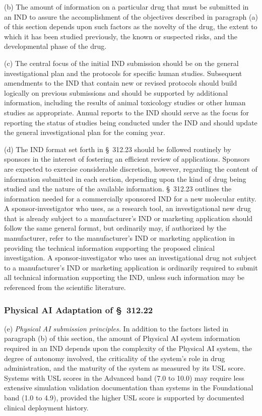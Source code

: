 \documentclass[11pt]{article}
\begin{document}
(b) The amount of information on a particular drug that must be submitted in an IND to assure the accomplishment of the objectives described in paragraph (a) of this section depends upon such factors as the novelty of the drug, the extent to which it has been studied previously, the known or suspected risks, and the developmental phase of the drug.

(c) The central focus of the initial IND submission should be on the general investigational plan and the protocols for specific human studies. Subsequent amendments to the IND that contain new or revised protocols should build logically on previous submissions and should be supported by additional information, including the results of animal toxicology studies or other human studies as appropriate. Annual reports to the IND should serve as the focus for reporting the status of studies being conducted under the IND and should update the general investigational plan for the coming year.

(d) The IND format set forth in \S~312.23 should be followed routinely by sponsors in the interest of fostering an efficient review of applications. Sponsors are expected to exercise considerable discretion, however, regarding the content of information submitted in each section, depending upon the kind of drug being studied and the nature of the available information. \S~312.23 outlines the information needed for a commercially sponsored IND for a new molecular entity. A sponsor-investigator who uses, as a research tool, an investigational new drug that is already subject to a manufacturer's IND or marketing application should follow the same general format, but ordinarily may, if authorized by the manufacturer, refer to the manufacturer's IND or marketing application in providing the technical information supporting the proposed clinical investigation. A sponsor-investigator who uses an investigational drug not subject to a manufacturer's IND or marketing application is ordinarily required to submit all technical information supporting the IND, unless such information may be referenced from the scientific literature.

\subsubsection{Physical AI Adaptation of \S~312.22}

(e) \textit{Physical AI submission principles.} In addition to the factors listed in paragraph (b) of this section, the amount of Physical AI system information required in an IND depends upon the complexity of the Physical AI system, the degree of autonomy involved, the criticality of the system's role in drug administration, and the maturity of the system as measured by its USL score. Systems with USL scores in the Advanced band (7.0 to 10.0) may require less extensive simulation validation documentation than systems in the Foundational band (1.0 to 4.9), provided the higher USL score is supported by documented clinical deployment history.
\end{document}

